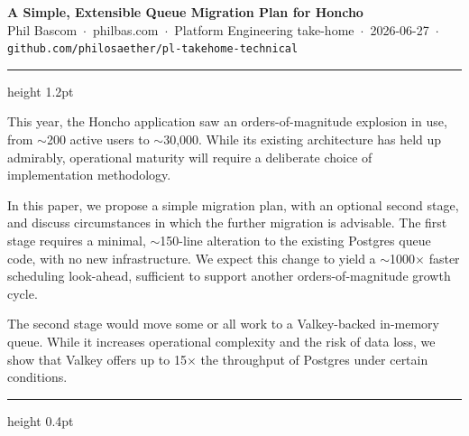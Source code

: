 \documentclass[10pt]{article}
\begin{document}
\thispagestyle{empty}

{\Large\bfseries A Simple, Extensible Queue Migration Plan for Honcho}\\[2pt]
{\footnotesize\color{ink!70}
Phil Bascom \,$\cdot$\, philbas.com \,$\cdot$\, Platform Engineering take-home
\,$\cdot$\, 2026-06-27 \,$\cdot$\,
\texttt{github.com/philosaether/pl-takehome-technical}}
\vspace{2pt}
{\color{rule}\hrule height 1.2pt}
\vspace{4pt}

{\small
This year, the Honcho application saw an orders-of-magnitude explosion in use,
from \mbox{$\sim$200} active users to \mbox{$\sim$30,000}. While its existing
architecture has held up admirably, operational maturity will
require a deliberate choice of implementation methodology.

In this paper, we propose a simple migration plan, with an optional second stage,
and discuss circumstances in which the further migration is advisable. The first
stage requires a minimal, \mbox{$\sim$150-line} alteration to the existing Postgres
queue code, with no new infrastructure. We expect this change to yield a \mbox{$\sim$1000$\times$}
faster scheduling look-ahead, sufficient to support another orders-of-magnitude growth cycle.

The second stage would move some or all work to a Valkey-backed in-memory queue.
While it increases operational complexity and the risk of data loss, we show that
Valkey offers up to 15$\times$ the throughput of Postgres under certain conditions.
}
\vspace{2pt}
{\color{rule}\hrule height 0.4pt}
\end{document}
